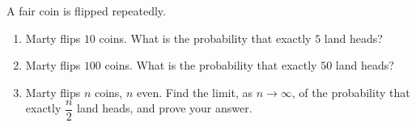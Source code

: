 A fair coin is flipped repeatedly.
\begin{enumerate}
\item[(a)] Marty flips $10$ coins. What is the probability that exactly $5$ land heads?
\item[(b)] Marty flips $100$ coins. What is the probability that exactly $50$ land heads?
\item[(c)] Marty flips $n$ coins, $n$ even. Find the limit, as $n\to\infty$, of the probability that exactly $\dfrac n2$ land heads, and prove your answer.
\end{enumerate}
